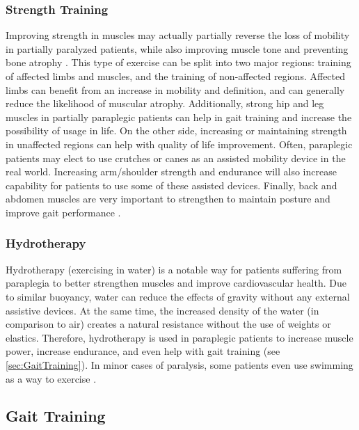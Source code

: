 \subsubsection{Strength Training}
Improving strength in muscles may actually partially reverse the loss of mobility in partially paralyzed patients, while also improving muscle tone \cite{AerobicCapacityParaplegia} and preventing bone atrophy \cite{ParalysisStretchingWeightLoadingPMID}. This type of exercise can be split into two major regions: training of affected limbs and muscles, and the training of non-affected regions. Affected limbs can benefit from an increase in mobility and definition, and can generally reduce the likelihood of muscular atrophy. Additionally, strong hip and leg muscles in partially paraplegic patients can help in gait training and increase the possibility of usage in life. On the other side, increasing or maintaining strength in unaffected regions can help with quality of life improvement. Often, paraplegic patients may elect to use crutches or canes as an assisted mobility device in the real world. Increasing arm/shoulder strength and endurance will also increase capability for patients to use some of these assisted devices. Finally, back and abdomen muscles are very important to strengthen to maintain posture and improve gait performance \cite{TrunkMuscleLoadingParaplegia}. 

\subsubsection{Hydrotherapy}
Hydrotherapy (exercising in water) is a notable way for patients suffering from paraplegia to better strengthen muscles and improve cardiovascular health. Due to similar buoyancy, water can reduce the effects of gravity without any external assistive devices. At the same time, the increased density of the water (in comparison to air) creates a natural resistance without the use of weights or elastics. Therefore, hydrotherapy is used in paraplegic patients to increase muscle power, increase endurance, and even help with gait training (see \autoref{sec:GaitTraining}). In minor cases of paralysis, some patients even use swimming as a way to exercise \cite{RehabParaplegia} \cite{BenefitsOfHydrotherapy}.

\subsection{Gait Training}
\label{sec:GaitTraining}


